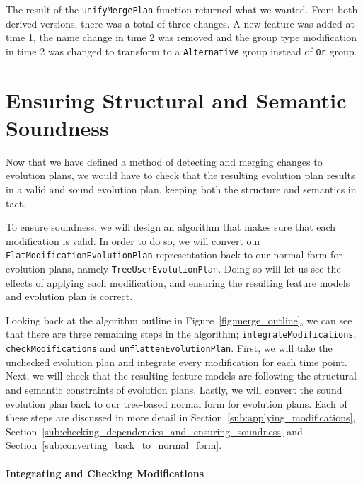 \documentclass[a4paper,english]{ifimaster}
\begin{document}
The result of the \texttt{unify\-Merge\-Plan} function returned what we wanted. From both derived versions, there was a total of three changes. A new feature was added at time 1, the name change in time 2 was removed and the group type modification in time 2 was changed to transform to a \texttt{Alternative} group instead of \texttt{Or} group.

\section{Ensuring Structural and Semantic Soundness}%
\label{sec:ensuring_structural_and_semantic_soundness_of_merge_result}

Now that we have defined a method of detecting and merging changes to evolution plans, we would have to check that the resulting evolution plan results in a valid and sound evolution plan, keeping both the structure and semantics in tact.

To ensure soundness, we will design an algorithm that makes sure that each modification is valid. In order to do so, we will convert our \texttt{Flat\-Modification\-Evolution\-Plan} representation back to our normal form for evolution plans, namely \texttt{Tree\-User\-Evolution\-Plan}. Doing so will let us see the effects of applying each modification, and ensuring the resulting feature models and evolution plan is correct.

Looking back at the algorithm outline in Figure~\vref{fig:merge_outline}, we can see that there are three remaining steps in the algorithm; \texttt{integrate\-Modifications}, \texttt{check\-Modifications} and \texttt{unflatten\-Evolution\-Plan}. First, we will take the unchecked evolution plan and integrate every modification for each time point. Next, we will check that the resulting feature models are following the structural and semantic constraints of evolution plans. Lastly, we will convert the sound evolution plan back to our tree-based normal form for evolution plans. Each of these steps are discussed in more detail in Section~\ref{sub:applying_modifications}, Section~\ref{sub:checking_dependencies_and_ensuring_soundness} and Section~\ref{sub:converting_back_to_normal_form}. 

\paragraph{Integrating and Checking Modifications}%
\label{par:integrating_and_checking_modifications}
\end{document}
